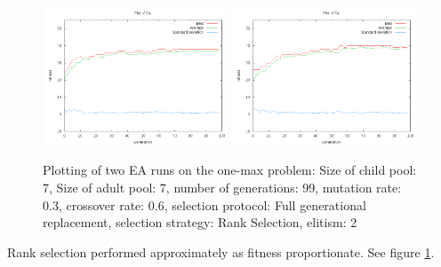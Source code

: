 \documentclass[11pt]{article}
\begin{document}
\begin{figure}[ht]
\begin{center}
\mbox{\includegraphics[width=0.49\textwidth]{images/ran1.png}}
\mbox{\includegraphics[width=0.49\textwidth]{images/ran2.png}}
\end{center}
\caption{Plotting of two EA runs on the one-max problem:
Size of child pool: 7,
Size of adult pool: 7,
number of generations: 99,
mutation rate: 0.3,
crossover rate: 0.6,
selection protocol: Full generational replacement,
selection strategy: Rank Selection,
elitism: 2}
\label{fig:8}
\end{figure}

Rank selection performed approximately as fitness proportionate. See figure \ref{fig:8}.
\end{document}
